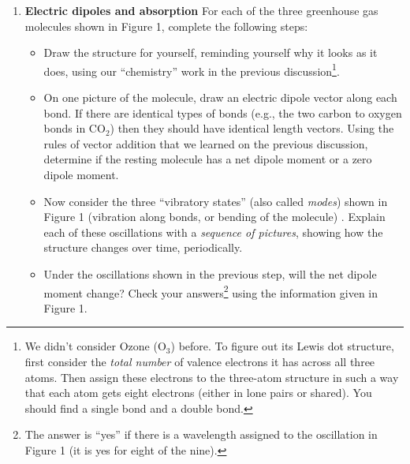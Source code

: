 \documentclass[12pt]{article}
\begin{document}
\begin{enumerate}

\item {\bf Electric dipoles and absorption} For each of the three greenhouse gas molecules shown in Figure 1, complete the following steps:
	\begin{itemize}
	\item Draw the structure for yourself, reminding yourself why it looks as it does, using our ``chemistry'' work in the previous discussion\footnote{We didn't consider Ozone ($\text{O}_3$) before.  To figure out its Lewis dot structure, first consider the {\em total number} of valence electrons it has across all three atoms. Then assign these electrons to the  three-atom structure in such a way that each atom gets eight electrons (either in lone pairs or shared).  You should find a single bond and a double bond.}.
	\item On one picture of the molecule, draw an electric dipole vector along each bond.  If there are identical types of bonds (e.g., the two carbon to oxygen bonds in $\text{C}\text{O}_2$) then they should have identical length vectors.  Using the rules of vector addition that we learned on the previous discussion, determine if the resting molecule has a net dipole moment or a zero dipole moment.
	\item Now consider the three ``vibratory states'' (also  called {\em modes}) shown in Figure 1 (vibration along bonds, or bending of the molecule) .  Explain each of these oscillations with a {\em sequence of pictures}, showing how the structure changes over time, periodically.
	\item Under the oscillations shown in the previous step, will the net dipole moment change?  Check your answers\footnote{The answer is ``yes'' if there is a wavelength assigned to the oscillation in Figure 1 (it is yes for eight of the nine).} using the information given in Figure 1.
	\end{itemize}


\end{enumerate}
\end{document}

